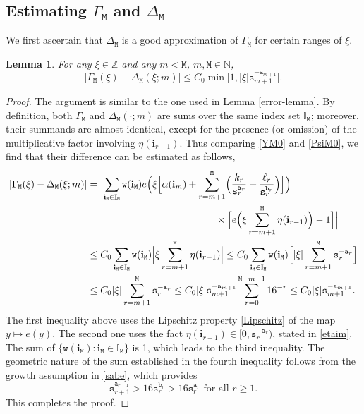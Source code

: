 \documentclass[12pt, twoside]{article}
\newtheorem{lemma}[theorem]{Lemma}
\theoremstyle{definition}
\numberwithin{equation}{section}
\begin{document}
\subsection{Estimating $\Gamma_{\mathtt M}$ and $\Delta_{\mathtt M}$} 
We first ascertain that $\Delta_{\mathtt M}$ is a good approximation of $\Gamma_{\mathtt M}$ for certain ranges of $\xi$. 
\begin{lemma} \label{approximation-lemma} 
For any $\xi \in \mathbb Z$ and any $m < \mathtt M$, $m, \mathtt M \in \mathbb N$, 
\begin{equation} \label{Y-Psi-error}
|\Gamma_{\mathtt M}(\xi) - \Delta_{\mathtt M}(\xi; m)| \leq C_0 \min \bigl[1, |\xi| \mathtt s_{m+1}^{-\mathtt a_{m+1}} \bigr]. 
\end{equation} 
\end{lemma} 
\begin{proof}
The argument is similar to the one used in Lemma \ref{error-lemma}. By definition, both $\Gamma_{\mathtt M}$ and $\Delta_{\mathtt M}(\cdot; m)$ are sums over the same index set $\mathbb I_{\mathtt M}$; moreover, their summands are almost identical, except for the presence (or omission) of the multiplicative factor involving $\eta(\mathbf i_{r-1})$. Thus comparing \eqref{YM0} and \eqref{PsiM0}, we find that their difference can be estimated as follows,    
\begin{align*} 
|\Gamma_{\mathtt M}(\xi) - \Delta_{\mathtt M}(\xi; m)| 
&= \Bigl| \sum_{\mathbf i_{\mathtt M} \in \mathbb I_{\mathtt M}} 
\mathtt w(\mathbf i_{\mathtt M}) e\Bigl(\xi \Bigl[\alpha(\mathbf i_{m}) +  \sum_{r = m+1}^{\mathtt M} \Bigl( \frac{k_r}{\mathtt s_r^{\mathtt a_r}} + \frac{\ell_r}{\mathtt s_r^{\mathtt b_r}} \Bigr) \Bigr] \Bigr) \\ &\hskip1.8in \times \Bigl[ e\Bigl( \xi \sum_{r=m+1}^{\mathtt M} \eta(\mathbf i_{r-1}) \Bigr) - 1\Bigr] \Bigr| \\ 
&\leq C_0 \sum_{\mathbf i_{\mathtt M} \in \mathbb I_{\mathtt M}} \mathtt w(\mathbf i_{\mathtt M}) \Bigl|  \xi \sum_{r=m+1}^{\mathtt M} \eta(\mathbf i_{r-1}) \Bigr| \leq C_0 \sum_{\mathbf i_{\mathtt M} \in \mathbb I_{\mathtt M}} \mathtt w(\mathbf i_{\mathtt M}) \Bigl[ |\xi| \sum_{r=m+1}^{\mathtt M} \mathtt s_{r}^{-\mathtt a_r} \Bigr] \\
&\leq C_0 |\xi| \sum_{r=m+1}^{\mathtt M} \mathtt s_{r}^{-\mathtt a_r} \leq C_0 |\xi| \mathtt s_{m+1}^{-\mathtt a_{m+1}} \sum_{r=0}^{\mathtt M-m-1} 16^{-r} \leq  C_0 |\xi| \mathtt s_{m+1}^{-\mathtt a_{m+1}}.  
\end{align*} 
The first inequality above uses the Lipschitz property \eqref{Lipschitz} of the map $y \mapsto e(y)$. The second one uses the fact $\eta(\mathbf i_{r-1}) \in [0, \mathtt s_{r}^{-\mathtt a_r})$, stated in \eqref{etaim}. The sum of $\{\mathtt w(\mathbf i_{\mathtt M}) : \mathbf i_{\mathtt M} \in \mathbb I_{\mathtt M} \}$ is 1, which leads to the third inequality. The geometric nature of the sum established in the fourth inequality follows from the growth assumption in \eqref{sabe}, which provides 
\[ \mathtt s_{r+1}^{\mathtt a_{r+1}} > 16 \mathtt s_r^{\mathtt b_r} > 16 \mathtt s_r^{\mathtt a_r} \text{ for all } r \geq 1. \] 
This completes the proof.  
\end{proof}
\end{document}
